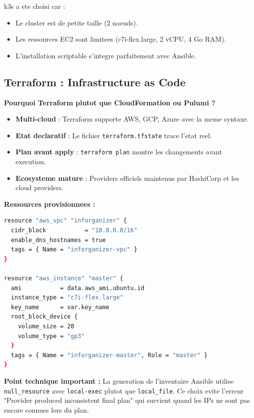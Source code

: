 \documentclass[12pt,a4paper,french]{report}
\begin{document}
k3s a ete choisi car :
\begin{itemize}
    \item Le cluster est de petite taille (2 noeuds).
    \item Les ressources EC2 sont limitees (c7i-flex.large, 2 vCPU, 4 Go RAM).
    \item L'installation scriptable s'integre parfaitement avec Ansible.
\end{itemize}

\subsection{Terraform : Infrastructure as Code}

\textbf{Pourquoi Terraform plutot que CloudFormation ou Pulumi ?}

\begin{itemize}
    \item \textbf{Multi-cloud} : Terraform supporte AWS, GCP, Azure avec la meme syntaxe.
    \item \textbf{Etat declaratif} : Le fichier \texttt{terraform.tfstate} trace l'etat reel.
    \item \textbf{Plan avant apply} : \texttt{terraform plan} montre les changements avant execution.
    \item \textbf{Ecosysteme mature} : Providers officiels maintenus par HashiCorp et les cloud providers.
\end{itemize}

\textbf{Ressources provisionnees :}

\begin{lstlisting}[language=bash, caption=Ressources Terraform (extrait de main.tf)]
resource "aws_vpc" "inforganizer" {
  cidr_block           = "10.0.0.0/16"
  enable_dns_hostnames = true
  tags = { Name = "inforganizer-vpc" }
}

resource "aws_instance" "master" {
  ami           = data.aws_ami.ubuntu.id
  instance_type = "c7i-flex.large"
  key_name      = var.key_name
  root_block_device {
    volume_size = 20
    volume_type = "gp3"
  }
  tags = { Name = "inforganizer-master", Role = "master" }
}
\end{lstlisting}

\textbf{Point technique important :} La generation de l'inventaire Ansible utilise \texttt{null\_resource} avec \texttt{local-exec} plutot que \texttt{local\_file}. Ce choix evite l'erreur "Provider produced inconsistent final plan" qui survient quand les IPs ne sont pas encore connues lors du plan.
\end{document}
